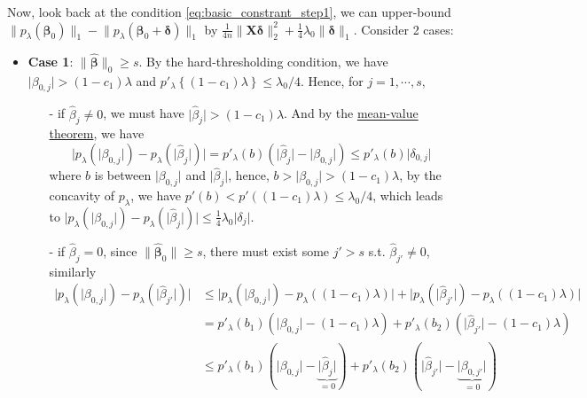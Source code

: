 \documentclass[twoside]{article}
\begin{document}
Now, look back at the condition \ref{eq:basic_constrant_step1}, we can upper-bound $ \lVert p_{\lambda}({\boldsymbol{\beta}_0}) \rVert _1 -  \lVert p_{\lambda}( \boldsymbol{\beta}_0+\boldsymbol{\delta}) \rVert _1$ by $\frac{1}{4n}\lVert \mathbf{X}\boldsymbol{\delta} \rVert^2_2+\frac{1}{4}\lambda_0\lVert\boldsymbol{\delta} \rVert _1$. Consider 2 cases:
\begin{itemize}
    \item \textbf{Case 1}: $\lVert \hat{\boldsymbol{\beta}} \rVert _0\geq s$. By the hard-thresholding condition, we have $\lvert\beta_{0,j}\rvert>(1-c_1)\lambda$ and $p'_{\lambda}\left\{ (1-c_1)\lambda \right\}\leq \lambda_0/4$. Hence, for $ j=1,\cdots,s$, 
    \begin{itemize}
        \item[-] if $\hat{\beta}_j\neq 0$, we must have $\lvert \hat{\beta}_j \rvert >(1-c_1)\lambda$. And by the \underline{mean-value theorem}, we have 
        $$\lvert p_{\lambda}(\lvert \beta_{0,j} \rvert)-p_{\lambda}(\lvert \hat{\beta}_{j} \rvert) \rvert = p'_{\lambda}(b)(\lvert \hat{\beta}_{j} \rvert - \lvert \beta_{0,j} \rvert)\leq p'_{\lambda}(b)\lvert \delta_{0,j} \rvert$$ 
        where $b$ is between $\lvert \beta_{0,j} \rvert$ and $\lvert \hat{\beta}_j \rvert$, hence, $b>\lvert\beta_{0,j}\rvert>(1-c_1)\lambda$, by the concavity of $p_{\lambda}$, we have $p'(b)<p'((1-c_1)\lambda)\leq \lambda_0/4$, which leads to $\lvert p_{\lambda}(\lvert \beta_{0,j} \rvert)-p_{\lambda}(\lvert \hat{\beta}_{j} \rvert) \rvert\leq \frac{1}{4}\lambda_0 \lvert\delta_j \rvert$.
        \item[-] if $\hat{\beta}_j=0$, since $\lVert \hat{\boldsymbol{\beta}}_0 \rVert \geq s$, there must exist some $j'>s$ s.t. $\hat{\beta}_{j'}\neq 0$, similarly 
        \begin{align*}
            \lvert p_{\lambda}(\lvert \beta_{0,j} \rvert)-p_{\lambda}(\lvert \hat{\beta}_{j'} \rvert) \rvert &\leq \lvert p_{\lambda}\left(\lvert \beta_{0,j} \rvert\right)-p_{\lambda}\left( (1-c_1)\lambda \right) \rvert + \lvert p_{\lambda}\left(\lvert \hat{\beta}_{j'} \rvert\right)-p_{\lambda}\left( (1-c_1)\lambda \right) \rvert \\
            &= p'_{\lambda}(b_1)\left( \lvert \beta_{0,j} \rvert - (1-c_1)\lambda \right) + p'_{\lambda}(b_2)\left( \lvert \hat{\beta}_{j'} \rvert - (1-c_1)\lambda \right) \\
            &\leq p'_{\lambda}(b_1)\left( \lvert \beta_{0,j} \rvert - \underbrace{\lvert \hat{\beta}_j \rvert}_{=0} \right) +  p'_{\lambda}(b_2) \left( \lvert \hat{\beta}_{j'} \rvert - \underbrace{\lvert \beta_{0,j'} \rvert}_{=0} \right) \\

\end{align*}
\end{itemize}
\end{itemize}
\end{document}
